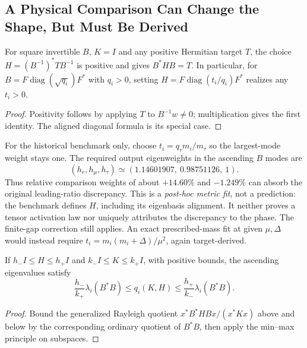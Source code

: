\subsection{A Physical Comparison Can Change the Shape, But Must Be Derived}

\begin{proposition}
\label{v480:tensor-comparison-fit-freedom}
For square invertible $B$, $K=I$ and any positive Hermitian target
$T$, the choice $H=(B^{-1})^*TB^{-1}$ is positive and gives
$B^*HB=T$. In particular, for
$B=F\operatorname{diag}(\sqrt{q_i})F^*$ with $q_i>0$, setting
$H=F\operatorname{diag}(t_i/q_i)F^*$ realizes any $t_i>0$.
\end{proposition}
\begin{proof}
Positivity follows by applying $T$ to $B^{-1}w\ne0$; multiplication
gives the first identity. The aligned diagonal formula is its special
case.
\end{proof}

For the historical benchmark only, choose
$t_i=q_\tau m_i/m_\tau$ so the largest-mode weight stays one.
The required output eigenweights in the ascending $B$ modes are
\[
 (h_e,h_\mu,h_\tau)
 \simeq(1.14601907,\ 0.98751126,\ 1).
\]
Thus relative comparison weights of about $+14.60\%$ and $-1.249\%$
can absorb the original leading-ratio discrepancy. This is a
\emph{post-hoc metric fit}, not a prediction: the benchmark defines
$H$, including its eigenbasis alignment. It neither proves a tensor
activation law nor uniquely attributes the discrepancy to the phase.
The finite-gap correction still applies. An exact prescribed-mass
fit at given $\mu,\Delta$ would instead require
$t_i=m_i(m_i+\Delta)/\mu^2$, again target-derived.

\begin{proposition}
\label{v480:tensor-metric-scale-bound}
If $h_-I\leq H\leq h_+I$ and $k_-I\leq K\leq k_+I$, with
positive bounds, the ascending eigenvalues satisfy
\[
 \frac{h_-}{k_+}\lambda_i(B^*B)
 \leq q_i(K,H)\leq
 \frac{h_+}{k_-}\lambda_i(B^*B).
\]
\end{proposition}
\begin{proof}
Bound the generalized Rayleigh quotient
$x^*B^*HBx/(x^*Kx)$ above and below by the corresponding ordinary
quotient of $B^*B$, then apply the min--max principle on subspaces.
\end{proof}

